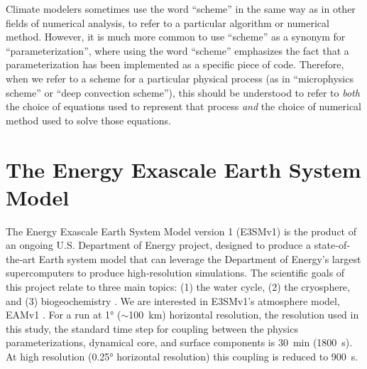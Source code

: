 \documentclass [11pt, proquest] {uwthesis}[2020/02/24]
\begin{document}
Climate modelers sometimes use the word ``scheme'' in the same way as in other fields of numerical analysis, to refer to a particular algorithm or numerical method. However, it is much more common to use ``scheme'' as a synonym for ``parameterization'', where using the word ``scheme'' emphasizes the fact that a parameterization has been implemented as a specific piece of code. Therefore, when we refer to a scheme for a particular physical process (as in ``microphysics scheme'' or ``deep convection scheme''), this should be understood to refer to \emph{both} the choice of equations used to represent that process \emph{and} the choice of numerical method used to solve those equations.

\section{The Energy Exascale Earth System Model} \label{sec:E3SM-intro}

The Energy Exascale Earth System Model version 1 (E3SMv1) is the product of an ongoing U.S. Department of Energy project, designed to produce a state‐of‐the‐art Earth system model that can leverage the Department of Energy's largest supercomputers to produce high‐resolution simulations. The scientific goals of this project relate to three main topics: (1) the water cycle, (2) the cryosphere, and (3) biogeochemistry \parencite{E3SM-v1}. We are interested in E3SMv1’s atmosphere model, EAMv1 \parencite{EAM-v1,Xie2018}. For a run at \ang{1} ($\sim$\SI{100}{\kilo\meter}) horizontal resolution, the resolution used in this study, the standard time step for coupling between the physics parameterizations, dynamical core, and surface components is \SI{30}{\minute} (\SI{1800}{\second}). At high resolution (\ang{0.25} horizontal resolution) this coupling is reduced to \SI{900}{\second}.
\end{document}
